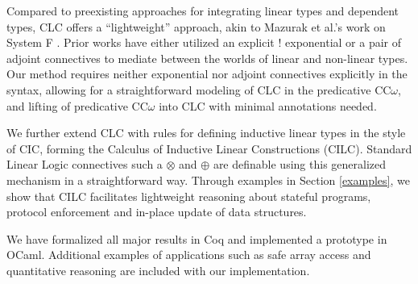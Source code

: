 \documentclass[sigplan,screen,review,anonymous]{acmart}
\begin{document}
Compared to preexisting approaches for integrating linear types and dependent types, CLC offers a ``lightweight'' approach, akin to Mazurak et al.'s work on System F \cite{mazurak}. Prior works have either utilized an explicit ! exponential or a pair of adjoint connectives to mediate between the worlds of linear and non-linear types. Our method requires neither exponential nor adjoint connectives explicitly in the syntax, allowing for a straightforward modeling of CLC in the predicative CC$\omega$, and lifting of predicative CC$\omega$ into CLC with minimal annotations needed.

We further extend CLC with rules for defining inductive linear types in the style of CIC, forming the Calculus of Inductive Linear Constructions (CILC). Standard Linear Logic connectives such a $\otimes$ and $\oplus$ are definable using this generalized mechanism in a straightforward way. Through examples in Section \ref{examples}, we show that CILC facilitates lightweight reasoning about stateful programs, protocol enforcement and in-place update of data structures.

We have formalized all major results in Coq and implemented a prototype in OCaml. Additional examples of applications such as safe array access and quantitative reasoning are included with our implementation.
\end{document}
